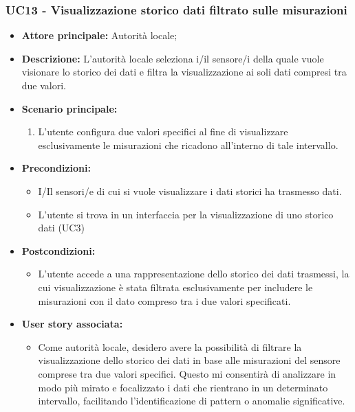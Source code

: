 \subsubsection{UC13 - Visualizzazione storico dati filtrato sulle misurazioni}
\begin{itemize}
    \item \textbf{Attore principale:} Autorità locale;
    \item \textbf{Descrizione:} L’autorità locale seleziona i/il sensore/i della quale vuole visionare lo storico dei dati e filtra la visualizzazione ai soli dati compresi tra due valori.
    \item \textbf{Scenario principale:}
          \begin{enumerate}
              \item L'utente configura due valori specifici al fine di visualizzare esclusivamente le misurazioni che ricadono all'interno di tale intervallo.
          \end{enumerate}
    \item \textbf{Precondizioni:}
          \begin{itemize}
              \item  I/Il sensori/e di cui si vuole visualizzare i dati storici ha trasmesso dati.
              \item  L'utente si trova in un interfaccia per la visualizzazione di uno storico dati (UC3)
          \end{itemize}
    \item \textbf{Postcondizioni:}
          \begin{itemize}
              \item  L'utente accede a una rappresentazione dello storico dei dati trasmessi, la cui visualizzazione è stata filtrata esclusivamente per includere le misurazioni con il dato compreso tra i due valori specificati.
          \end{itemize}
    \item \textbf{User story associata:}
          \begin{itemize}
            \item Come autorità locale, desidero avere la possibilità di filtrare la visualizzazione dello storico dei dati in base alle misurazioni del sensore comprese tra due valori specifici. Questo mi consentirà di analizzare in modo più mirato e focalizzato i dati che rientrano in un determinato intervallo, facilitando l'identificazione di pattern o anomalie significative.
          \end{itemize}
\end{itemize}
